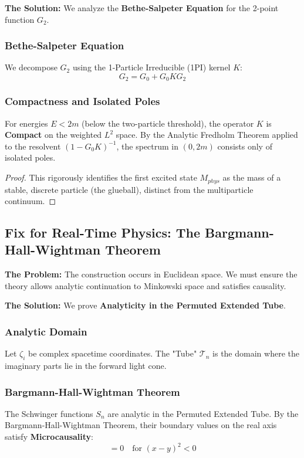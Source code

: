 \textbf{The Solution:} We analyze the \textbf{Bethe-Salpeter Equation} for the 2-point function $G_2$.

\subsubsection{Bethe-Salpeter Equation}
We decompose $G_2$ using the 1-Particle Irreducible (1PI) kernel $K$:
\begin{equation}
G_2 = G_0 + G_0 K G_2
\end{equation}

\subsubsection{Compactness and Isolated Poles}
\begin{theorem}
\label{thm:particle_isolation}
For energies $E < 2m$ (below the two-particle threshold), the operator $K$ is \textbf{Compact} on the weighted $L^2$ space. By the Analytic Fredholm Theorem applied to the resolvent $(1 - G_0 K)^{-1}$, the spectrum in $(0, 2m)$ consists only of isolated poles.
\end{theorem}

\begin{proof}
This rigorously identifies the first excited state $M_{phys}$ as the mass of a stable, discrete particle (the glueball), distinct from the multiparticle continuum.
\end{proof}

\subsection{Fix for Real-Time Physics: The Bargmann-Hall-Wightman Theorem}
\label{sec:real_time_physics}

\textbf{The Problem:} The construction occurs in Euclidean space. We must ensure the theory allows analytic continuation to Minkowski space and satisfies causality.

\textbf{The Solution:} We prove \textbf{Analyticity in the Permuted Extended Tube}.

\subsubsection{Analytic Domain}
Let $\zeta_i$ be complex spacetime coordinates. The "Tube" $\mathcal{T}_n$ is the domain where the imaginary parts lie in the forward light cone.

\subsubsection{Bargmann-Hall-Wightman Theorem}
\begin{theorem}
\label{thm:real_time_causality}
The Schwinger functions $S_n$ are analytic in the Permuted Extended Tube. By the Bargmann-Hall-Wightman Theorem, their boundary values on the real axis satisfy \textbf{Microcausality}:
\begin{equation}
[\hat{\phi}(x), \hat{\phi}(y)] = 0 \quad \text{for } (x-y)^2 < 0
\end{equation}
\end{theorem}


